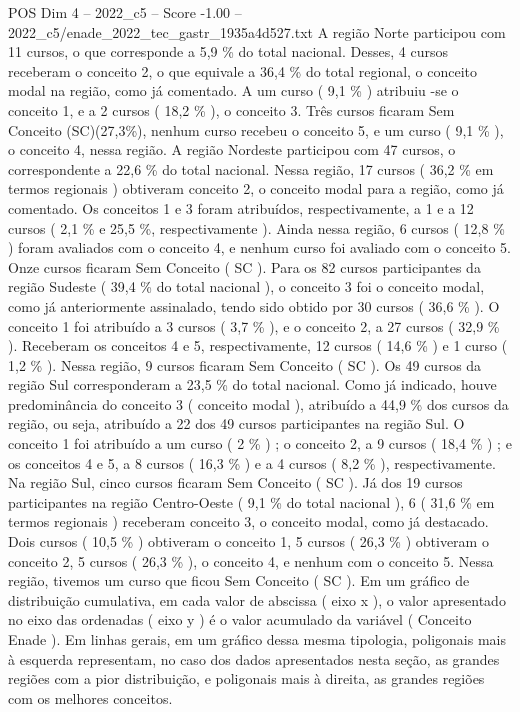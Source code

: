 \begin{textsample}{POS Dim 4 – 2022\_c5 – Score -1.00 – 2022\_c5/enade\_2022\_tec\_gastr\_1935a4d527.txt}
A região Norte participou com 11 cursos, o que corresponde a 5,9 \% do total nacional.
Desses, 4 cursos receberam o conceito 2, o que equivale a 36,4 \% do total regional, o conceito modal na região, como já comentado.
A um curso ( 9,1 \% ) atribuiu -se o conceito 1, e a 2 cursos ( 18,2 \% ), o conceito 3.
Três cursos ficaram Sem Conceito (SC)(27,3\%), nenhum curso recebeu o conceito 5, e um curso ( 9,1 \% ), o conceito 4, nessa região.
A região Nordeste participou com 47 cursos, o correspondente a 22,6 \% do total nacional.
Nessa região, 17 cursos ( 36,2 \% em termos regionais ) obtiveram conceito 2, o conceito modal para a região, como já comentado.
Os conceitos 1 e 3 foram atribuídos, respectivamente, a 1 e a 12 cursos ( 2,1 \% e 25,5 \%, respectivamente ).
Ainda nessa região, 6 cursos ( 12,8 \% ) foram avaliados com o conceito 4, e nenhum curso foi avaliado com o conceito 5.
Onze cursos ficaram Sem Conceito ( SC ).
Para os 82 cursos participantes da região Sudeste ( 39,4 \% do total nacional ), o conceito 3 foi o conceito modal, como já anteriormente assinalado, tendo sido obtido por 30 cursos ( 36,6 \% ).
O conceito 1 foi atribuído a 3 cursos ( 3,7 \% ), e o conceito 2, a 27 cursos ( 32,9 \% ).
Receberam os conceitos 4 e 5, respectivamente, 12 cursos ( 14,6 \% ) e 1 curso ( 1,2 \% ).
Nessa região, 9 cursos ficaram Sem Conceito ( SC ).
Os 49 cursos da região Sul corresponderam a 23,5 \% do total nacional.
Como já indicado, houve predominância do conceito 3 ( conceito modal ), atribuído a 44,9 \% dos cursos da região, ou seja, atribuído a 22 dos 49 cursos participantes na região Sul.
O conceito 1 foi atribuído a um curso ( 2 \% ) ; o conceito 2, a 9 cursos ( 18,4 \% ) ; e os conceitos 4 e 5, a 8 cursos ( 16,3 \% ) e a 4 cursos ( 8,2 \% ), respectivamente.
Na região Sul, cinco cursos ficaram Sem Conceito ( SC ).
Já dos 19 cursos participantes na região Centro-Oeste ( 9,1 \% do total nacional ), 6 ( 31,6 \% em termos regionais ) receberam conceito 3, o conceito modal, como já destacado.
Dois cursos ( 10,5 \% ) obtiveram o conceito 1, 5 cursos ( 26,3 \% ) obtiveram o conceito 2, 5 cursos ( 26,3 \% ), o conceito 4, e nenhum com o conceito 5.
Nessa região, tivemos um curso que ficou Sem Conceito ( SC ).
Em um gráfico de distribuição cumulativa, em cada valor de abscissa ( eixo x ), o valor apresentado no eixo das ordenadas ( eixo y ) é o valor acumulado da variável ( Conceito Enade ).
Em linhas gerais, em um gráfico dessa mesma tipologia, poligonais mais à esquerda representam, no caso dos dados apresentados nesta seção, as grandes regiões com a pior distribuição, e poligonais mais à direita, as grandes regiões com os melhores conceitos.

\end{textsample}

